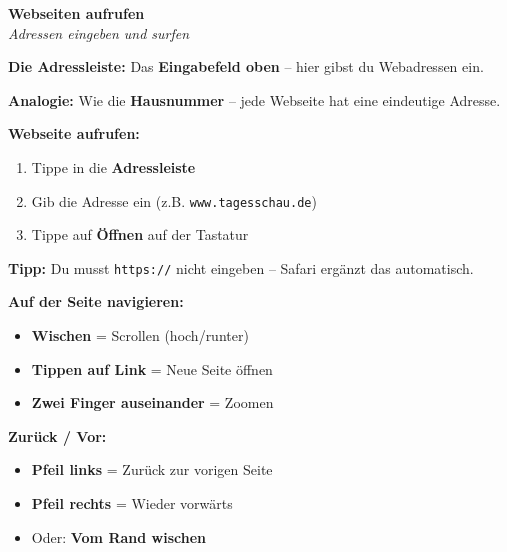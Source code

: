 \documentclass[a4paper,landscape,8pt]{extarticle}
\begin{document}
\hfill%
\begin{minipage}[t]{0.32\linewidth}
\begin{center}
\colorbox{addressgreen!10}{%
\begin{minipage}{0.95\linewidth}
\vspace{2mm}
\begin{center}
{\Large\bfseries\textcolor{addressgreen}{Webseiten aufrufen}}\\[1pt]
{\footnotesize\itshape Adressen eingeben und surfen}
\end{center}
\vspace{2mm}
\end{minipage}%
}
\end{center}

\vspace{1mm}

\textbf{Die Adressleiste:} Das \textbf{Eingabefeld oben} -- hier gibst du Webadressen ein.

\textbf{Analogie:} Wie die \textbf{Hausnummer} -- jede Webseite hat eine eindeutige Adresse.

\vspace{2mm}

\textbf{Webseite aufrufen:}
\begin{enumerate}
\item Tippe in die \textbf{Adressleiste}
\item Gib die Adresse ein (z.B. \texttt{www.tagesschau.de})
\item Tippe auf \textbf{\glqq Öffnen\grqq{}} auf der Tastatur
\end{enumerate}

\textbf{Tipp:} Du musst \texttt{https://} nicht eingeben -- Safari ergänzt das automatisch.

\vspace{2mm}

\textbf{Auf der Seite navigieren:}
\begin{itemize}
\item \textbf{Wischen} = Scrollen (hoch/runter)
\item \textbf{Tippen auf Link} = Neue Seite öffnen
\item \textbf{Zwei Finger auseinander} = Zoomen
\end{itemize}

\textbf{Zurück / Vor:}
\begin{itemize}
\item \textbf{Pfeil links} = Zurück zur vorigen Seite
\item \textbf{Pfeil rechts} = Wieder vorwärts
\item Oder: \textbf{Vom Rand wischen}
\end{itemize}

\end{minipage}%
\end{document}

